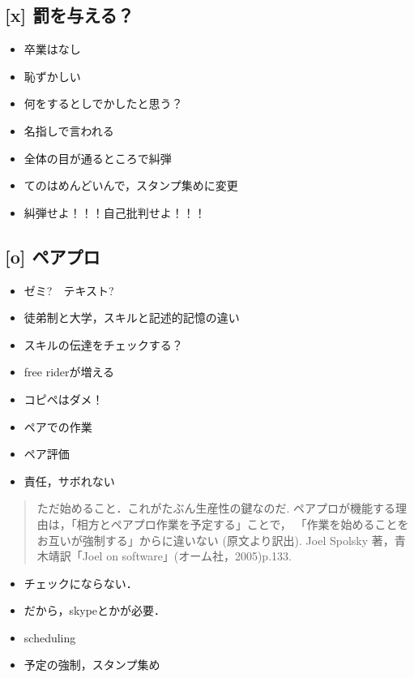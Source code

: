 \documentclass{hissymp}
\begin{document}
\subsection{[x] 罰を与える？　}
\label{sec:orgac3ea1b}
\begin{itemize}
\item 卒業はなし
\item 恥ずかしい
\item 何をするとしでかしたと思う？
\item 名指しで言われる
\item 全体の目が通るところで糾弾
\item てのはめんどいんで，スタンプ集めに変更
\item 糾弾せよ！！！自己批判せよ！！！
\end{itemize}
\subsection{[o] ペアプロ}
\label{sec:org29b49db}
\begin{itemize}
\item ゼミ?　テキスト?
\item 徒弟制と大学，スキルと記述的記憶の違い
\item スキルの伝達をチェックする？
\item free riderが増える
\item コピペはダメ！
\item ペアでの作業
\item ペア評価
\item 責任，サボれない
\end{itemize}

\begin{quote}
ただ始めること．これがたぶん生産性の鍵なのだ.
ペアプロが機能する理由は，「相方とペアプロ作業を予定する」ことで，
「作業を始めることをお互いが強制する」からに違いない
(原文より訳出).
Joel Spolsky 著，青木靖訳「Joel on software」(オーム社，2005)p.133.
\end{quote}

\begin{itemize}
\item チェックにならない．
\item だから，skypeとかが必要．

\item scheduling
\item 予定の強制，スタンプ集め
\end{itemize}
\end{document}
